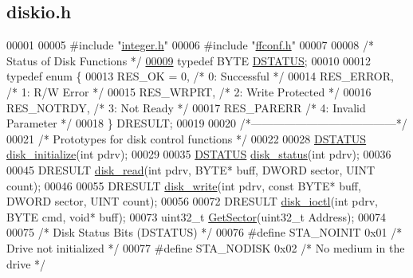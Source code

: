 \hypertarget{diskio_8h_source}{\subsection{diskio.\+h}
\label{diskio_8h_source}
}

\begin{DoxyCode}
00001 
00005 \textcolor{preprocessor}{#include "\hyperlink{integer_8h}{integer.h}"}
00006 \textcolor{preprocessor}{#include "\hyperlink{ffconf_8h}{ffconf.h}"}
00007 
00008 \textcolor{comment}{/* Status of Disk Functions */}
\hypertarget{diskio_8h_source_l00009}{}\hyperlink{diskio_8h_adba6790898ce4029c20a34b898ce73c1}{00009} \textcolor{keyword}{typedef} BYTE \hyperlink{diskio_8h_adba6790898ce4029c20a34b898ce73c1}{DSTATUS};
00010 
00012 \textcolor{keyword}{typedef} \textcolor{keyword}{enum} \{
00013   RES\_OK = 0, \textcolor{comment}{/* 0: Successful */}
00014   RES\_ERROR,  \textcolor{comment}{/* 1: R/W Error */}
00015   RES\_WRPRT,  \textcolor{comment}{/* 2: Write Protected */}
00016   RES\_NOTRDY, \textcolor{comment}{/* 3: Not Ready */}
00017   RES\_PARERR  \textcolor{comment}{/* 4: Invalid Parameter */}
00018 \} DRESULT;
00019 
00020 \textcolor{comment}{/*---------------------------------------*/}
00021 \textcolor{comment}{/* Prototypes for disk control functions */}
00022 
00028 \hyperlink{diskio_8h_adba6790898ce4029c20a34b898ce73c1}{DSTATUS} \hyperlink{diskio_8h_aa01f5479a3ee7c9aed89814238964cd2}{disk\_initialize}(\textcolor{keywordtype}{int} pdrv);
00029 
00035 \hyperlink{diskio_8h_adba6790898ce4029c20a34b898ce73c1}{DSTATUS} \hyperlink{diskio_8h_a308c9b0a83724bf6e6aae72a736cc7a6}{disk\_status}(\textcolor{keywordtype}{int} pdrv);
00036 
00045 DRESULT \hyperlink{diskio_8h_a9c6f716a2119a650cf3c61bee540be85}{disk\_read}(\textcolor{keywordtype}{int} pdrv, BYTE* buff, DWORD sector, UINT count);
00046 
00055 DRESULT \hyperlink{diskio_8h_a4fc55609dc0b2fba35c679984ae7ca68}{disk\_write}(\textcolor{keywordtype}{int} pdrv, \textcolor{keyword}{const} BYTE* buff, DWORD sector, UINT count);
00056 
00072 DRESULT \hyperlink{diskio_8h_a816bffc54e390c15d03f477133707de5}{disk\_ioctl}(\textcolor{keywordtype}{int} pdrv, BYTE cmd, \textcolor{keywordtype}{void}* buff);
00073 uint32\_t \hyperlink{diskio_8h_a90db73e2ffb962de6891c783f62db0d0}{GetSector}(uint32\_t Address);
00074 
00075 \textcolor{comment}{/* Disk Status Bits (DSTATUS) */}
00076 \textcolor{preprocessor}{#define STA\_NOINIT    0x01  }\textcolor{comment}{/* Drive not initialized */}\textcolor{preprocessor}{}
00077 \textcolor{preprocessor}{#define STA\_NODISK    0x02  }\textcolor{comment}{/* No medium in the drive */}\textcolor{preprocessor}{}

\end{DoxyCode}
